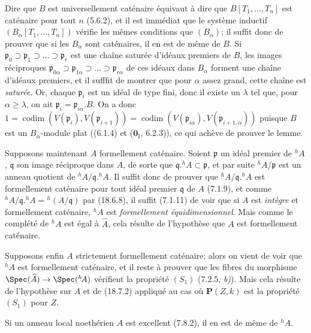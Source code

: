 Dire que $B$ est universellement caténaire équivaut à dire que $B[T_1,\ldots,T_n]$ est caténaire pour tout $n$ (5.6.2), et il est immédiat que le système inductif $(B_\alpha[T_1,\ldots,T_n])$ vérifie les mêmes conditions que $(B_\alpha)$; il suffit donc de prouver que si les $B_\alpha$ sont caténaires, il en est de même de $B$. Si $\mathfrak p_0\supset\mathfrak p_1\supset\ldots\supset\mathfrak p_r$ est une chaîne saturée d'idéaux premiers de $B$, les images réciproques $\mathfrak p_{0\alpha}\supset\mathfrak p_{1\alpha}\supset\ldots\supset\mathfrak p_{r\alpha}$ de ces idéaux dans $B_\alpha$ forment une chaîne d'idéaux premiers, et il sufffit de montrer que pour $\alpha$ assez grand, cette chaîne est \emph{saturée}. Or, chaque $\mathfrak p_i$ est un idéal de type fini, donc il existe un $\lambda$ tel que, pour $\alpha\geq\lambda$, on ait $\mathfrak p_i=\mathfrak p_{i\alpha}.B$. On a donc $1=\operatorname{codim}(V(\mathfrak p_i),V(\mathfrak p_{i+1}))=\operatorname{codim}(V(\mathfrak p_{i\alpha}),V(\mathfrak p_{i+1,\alpha}))$ puisque $B$ est un $B_\alpha$-module plat ((6.1.4) et ($\mathbf{0}_{\mathrm I}$, 6.2.3)), ce qui achève de prouver le lemme.

Supposons maintenant $A$ formellement caténaire. Soient $\mathfrak p$ un idéal premier de ${}^h\!A$, $\mathfrak q$ son image réciproque dans $A$, de sorte que $\mathfrak q.{}^h\!A\subset\mathfrak p$, et par suite ${}^h\!A/\mathfrak p$ est un anneau quotient de ${}^h\!A/\mathfrak q.{}^h\!A$. Il suffit donc de prouver que ${}^h\!A/\mathfrak q.{}^h\!A$ est formellement caténaire pour tout idéal premier $\mathfrak q$ de $A$ (7.1.9), et comme ${}^h\!A/\mathfrak q.{}^h\!A={}^h(A/\mathfrak q)$ par (18.6.8), il suffit (7.1.11) de voir que si $A$ est \emph{intègre} et formellement caténaire, ${}^h\!A$ est \emph{formellement équidimensionnel}. Mais comme le complété de ${}^h\!A$ est égal à $\widehat A$, cela résulte de l'hypothèse que $A$ est formellement caténaire.


Supposons enfin $A$ strictement formellement caténaire; alors on vient de voir que ${}^h\!A$ est formellement caténaire, et il reste à prouver que les fibres du morphisme $\Spec(\widehat A)\to\Spec({}^h\!A)$ vérifient la propriété $(S_1)$ (7.2.5, \emph{b)}). Mais cela résulte de l'hypothèse sur $A$ et de (18.7.2) appliqué au cas où $\boldsymbol{P}(Z,k)$ est la propriété $(S_1)$ pour $Z$.

\begin{corollary}[18.7.6]
\label{IV.18.7.6}
Si un anneau local noethérien $A$ est excellent \textup{(7.8.2)}, il en est de même de ${}^h\!A$.
\end{corollary}


